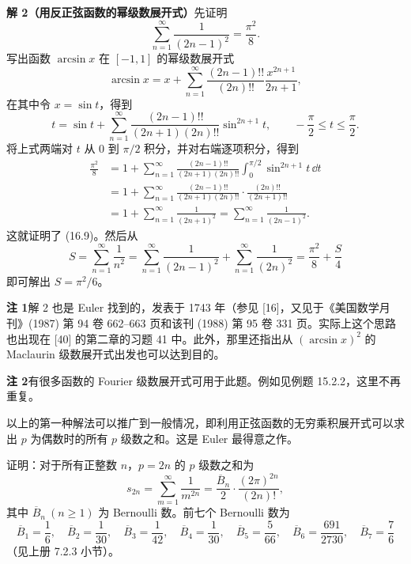 \begin{xsolution}
\textbf{解 2（用反正弦函数的幂级数展开式）}\quad 先证明
\begin{equation}
  \sum_{n=1}^{\infty}\frac1{(2n-1)^2}=\frac{\pi^2}{8}.
\tag{16.9}
\label{eq:16.9}
\end{equation}
写出函数 $\arcsin x$ 在 $[-1,1]$ 的幂级数展开式
\[
  \arcsin x=x+\sum_{n=1}^{\infty}\frac{(2n-1)!!}{(2n)!!}\frac{x^{2n+1}}{2n+1},
\]
在其中令 $x=\sin t$，得到
\[
  t=\sin t+\sum_{n=1}^{\infty}
  \frac{(2n-1)!!}{(2n+1)(2n)!!}\sin^{2n+1}t,
  \qquad -\frac\pi2\leqslant t\leqslant\frac\pi2.
\]
将上式两端对 $t$ 从 0 到 $\pi/2$ 积分，并对右端逐项积分，得到
\[
\begin{aligned}
  \frac{\pi^2}{8}
  &=1+\sum_{n=1}^{\infty}\frac{(2n-1)!!}{(2n+1)(2n)!!}
      \int_0^{\pi/2}\sin^{2n+1}t\,\dd t\\
  &=1+\sum_{n=1}^{\infty}\frac{(2n-1)!!}{(2n+1)(2n)!!}
      \cdot\frac{(2n)!!}{(2n+1)!!}\\
  &=1+\sum_{n=1}^{\infty}\frac1{(2n+1)^2}
   =\sum_{n=1}^{\infty}\frac1{(2n-1)^2}.
\end{aligned}
\]
这就证明了 (16.9)。然后从
\[
  S=\sum_{n=1}^{\infty}\frac1{n^2}
   =\sum_{n=1}^{\infty}\frac1{(2n-1)^2}
    +\sum_{n=1}^{\infty}\frac1{(2n)^2}
   =\frac{\pi^2}{8}+\frac S4
\]
即可解出 $S=\pi^2/6$。
\end{xsolution}

\begin{xremark}
\textbf{注 1}\quad 解 2 也是 Euler 找到的，发表于 1743 年（参见 [16]，又见于《美国数学月刊》(1987) 第 94 卷 662--663 页和该刊 (1988) 第 95 卷 331 页。实际上这个思路也出现在 [40] 的第二章的习题 41 中。此外，那里还指出从 $(\arcsin x)^2$ 的 Maclaurin 级数展开式出发也可以达到目的。

\textbf{注 2}\quad 有很多函数的 Fourier 级数展开式可用于此题。例如见例题 15.2.2，这里不再重复。
\end{xremark}

以上的第一种解法可以推广到一般情况，即利用正弦函数的无穷乘积展开式可以求出 $p$ 为偶数时的所有 $p$ 级数之和。这是 Euler 最得意之作。

\begin{xexample}[16.2.3]
证明：对于所有正整数 $n$，$p=2n$ 的 $p$ 级数之和为
\begin{equation}
  s_{2n}=\sum_{m=1}^{\infty}\frac1{m^{2n}}
  =\frac{\overline B_n}{2}\cdot\frac{(2\pi)^{2n}}{(2n)!},
\tag{16.10}
\label{eq:16.10}
\end{equation}
其中 $\overline B_n\ (n\geqslant1)$ 为 Bernoulli 数。前七个 Bernoulli 数为
\[
  \overline B_1=\frac16,\quad \overline B_2=\frac1{30},\quad
  \overline B_3=\frac1{42},\quad \overline B_4=\frac1{30},\quad
  \overline B_5=\frac5{66},\quad \overline B_6=\frac{691}{2730},\quad
  \overline B_7=\frac76
\]
（见上册 7.2.3 小节）。
\end{xexample}

